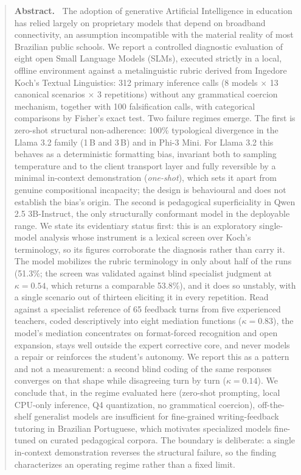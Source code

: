 \documentclass{sbc2023}%
\begin{document}
\begin{frontmatter}
\begin{abstract}
\textbf{Abstract.~}
\noindent The adoption of generative Artificial Intelligence in education has relied largely on proprietary models that depend on broadband connectivity, an assumption incompatible with the material reality of most Brazilian public schools. We report a controlled diagnostic evaluation of eight open Small Language Models (SLMs), executed strictly in a local, offline environment against a metalinguistic rubric derived from Ingedore Koch's Textual Linguistics: 312 primary inference calls (8 models $\times$ 13 canonical scenarios $\times$ 3 repetitions) without any grammatical coercion mechanism, together with 100 falsification calls, with categorical comparisons by Fisher's exact test. Two failure regimes emerge. The first is zero-shot structural non-adherence: 100\% typological divergence in the Llama 3.2 family (1\,B and 3\,B) and in Phi-3 Mini. For Llama 3.2 this behaves as a deterministic formatting bias, invariant both to sampling temperature and to the client transport layer and fully reversible by a minimal in-context demonstration (\textit{one-shot}), which sets it apart from genuine compositional incapacity; the design is behavioural and does not establish the bias's origin. The second is pedagogical superficiality in Qwen 2.5 3B-Instruct, the only structurally conformant model in the deployable range. We state its evidentiary status first: this is an exploratory single-model analysis whose instrument is a lexical screen over Koch's terminology, so its figures corroborate the diagnosis rather than carry it. The model mobilizes the rubric terminology in only about half of the runs (51.3\%; the screen was validated against blind specialist judgment at $\kappa = 0.54$, which returns a comparable 53.8\%), and it does so unstably, with a single scenario out of thirteen eliciting it in every repetition. Read against a specialist reference of 65 feedback turns from five experienced teachers, coded descriptively into eight mediation functions ($\kappa = 0.83$), the model's mediation concentrates on format-forced recognition and open expansion, stays well outside the expert corrective core, and never models a repair or reinforces the student's autonomy. We report this as a pattern and not a measurement: a second blind coding of the same responses converges on that shape while disagreeing turn by turn ($\kappa = 0.14$). We conclude that, in the regime evaluated here (zero-shot prompting, local CPU-only inference, Q4 quantization, no grammatical coercion), off-the-shelf generalist models are insufficient for fine-grained writing-feedback tutoring in Brazilian Portuguese, which motivates specialized models fine-tuned on curated pedagogical corpora. The boundary is deliberate: a single in-context demonstration reverses the structural failure, so the finding characterizes an operating regime rather than a fixed limit.
\end{abstract}


\end{frontmatter}
\end{document}
